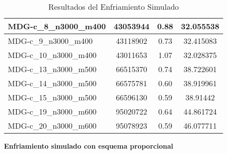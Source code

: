 \documentclass[11pt,a4paper]{article}
\begin{document}
\begin{table}[H]
\begin{center}
\begin{tabular}{|l|c|c|c|}
		MDG-c\_8\_n3000\_m400 & 43053944 & 0.88 & 32.055538 \\ \hline
		MDG-c\_9\_n3000\_m400 & 43118902 & 0.73 & 32.415083 \\ \hline
		MDG-c\_10\_n3000\_m400 & 43011653 & 1.07 & 32.028375 \\ \hline
		MDG-c\_13\_n3000\_m500 & 66515370 & 0.74 & 38.722601 \\ \hline
		MDG-c\_14\_n3000\_m500 & 66575781 & 0.60 & 38.919961 \\ \hline
		MDG-c\_15\_n3000\_m500 & 66596130 & 0.59 & 38.91442 \\ \hline
		MDG-c\_19\_n3000\_m600 & 95020722 & 0.64 & 44.861724 \\ \hline
		MDG-c\_20\_n3000\_m600 & 95078923 & 0.59 & 46.077711 \\ \hline
	\end{tabular}
	\caption{Resultados del Enfriamiento Simulado}
	\label{}
	\end{center}
\end{table}
\newpage
\textbf{Enfriamiento simulado con esquema proporcional}
\end{document}
